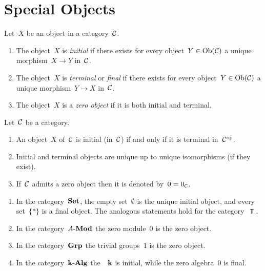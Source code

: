 \section{Special Objects}


\begin{definition}
  Let~$X$ be an object in a category~$\mathcal{C}$.
  \begin{enumerate}
    \item
      The object~$X$ is \emph{initial} if there exists  for every object~$Y \in \operatorname{Ob}(\mathcal{C})$ a unique morphism~$X \to Y$ in~$\mathcal{C}$.
    \item
      The object~$X$ is \emph{terminal} or \emph{final} if there exists for every object~$Y \in \operatorname{Ob}(\mathcal{C})$ a unique morphism~$Y \to X$ in~$\mathcal{C}$.
    \item
      The object~$X$ is a \emph{zero object} if it is both initial and terminal.
  \end{enumerate}
\end{definition}


\begin{remark}
  Let~$\mathcal{C}$ be a category.
  \begin{enumerate}
    \item
      An object~$X$ of~$\mathcal{C}$ is initial (in~$\mathcal{C}$) if and only if it is terminal in~$\mathcal{C}^{\mathrm{op}}$.
    \item
      Initial and terminal objects are unique up to unique isomorphisms (if they exist).
    \item
      If~$\mathcal{C}$ admits a zero object then it is denoted by~$0 = 0_{\mathcal{C}}$.
  \end{enumerate}
\end{remark}


\begin{example}
  \leavevmode
  \begin{enumerate}
    \item
      In the category~$\mathbf{Set}$, the empty set~$\emptyset$ is the unique initial object, and every  set~$\{\ast\}$ is a final object.
      The analogous statements hold for the category~$\Top$.
    \item
      In the category~$\text{$A$-$\mathbf{Mod}$}$ the zero module~$0$ is the zero object.
    \item
      In the category~$\mathbf{Grp}$ the trivial groups~$1$ is the zero object.
    \item
      In the category~$\text{$\mathbf{k}$-$\mathbf{Alg}$}$ the~{\kalg}~$\mathbf{k}$ is initial, while the zero algebra~$0$ is final.
  \end{enumerate}
\end{example}


